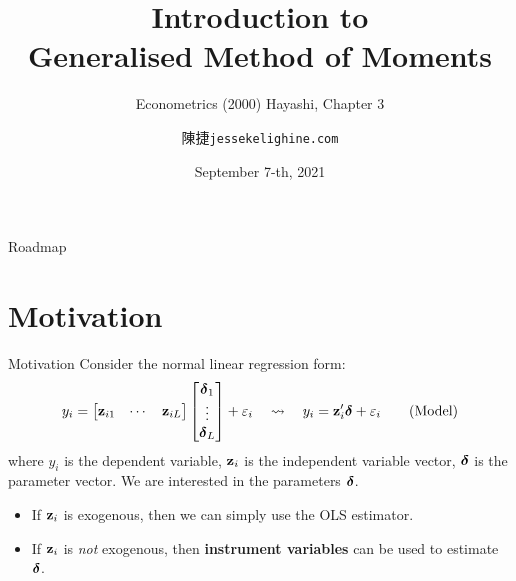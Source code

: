 \documentclass{beamer}
\title{\textbf{Introduction to \\Generalised Method of Moments}}
\subtitle{Econometrics (2000) Hayashi, Chapter 3}
\author{陳\;捷\hspace{1em}\texttt{jessekelighine.com}}
\date{September 7-th, 2021}
\begin{document}
\begin{frame}
	\maketitle
\end{frame}

\begin{frame}{Roadmap}
	\tableofcontents
\end{frame}

\section{Motivation}

\begin{frame}{Motivation}
	Consider the normal linear regression form:
	\begin{align}
		y_i =
		\begin{bmatrix}
			\mathbf{z}_{i1} & \cdots & \mathbf{z}_{iL}
		\end{bmatrix}
		\begin{bmatrix}
			\boldsymbol{\delta}_1\\\vdots\\\boldsymbol{\delta}_L
		\end{bmatrix}
		+ \varepsilon_i
		\quad\leadsto\quad
		y_i = \mathbf{z}_i'\boldsymbol{\delta} + \varepsilon_i
		\tag{Model}
	\end{align}
	where
	$y_i$ is the dependent variable,
	$\mathbf{z}_i$ is the independent variable vector,
	$\boldsymbol{\delta}$ is the parameter vector.
	We are interested in the parameters $\boldsymbol{\delta}$.
	\begin{itemize}
		\item
			If $\mathbf{z}_i$ is exogenous, then we can simply use the OLS estimator.
		\item
			If $\mathbf{z}_i$ is \emph{not} exogenous,
			then \textbf{instrument variables} can be used
			to estimate $\boldsymbol{\delta}$.
	\end{itemize}
\end{frame}
\end{document}
